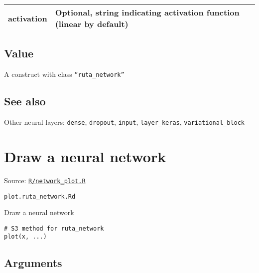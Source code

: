 \begin{longtable}[c]{@{}>{\small}p{3cm}>{\raggedright}p{12.5cm}@{}}
\toprule
activation & Optional, string indicating activation function (linear by
default)\tabularnewline
\bottomrule
\end{longtable}

\hypertarget{value}{\subsection{\texorpdfstring{\protect\hyperlink{value}{}Value}{Value}}\label{value}}

A construct with class \texttt{``ruta\_network''}

\hypertarget{see-also}{\subsection{\texorpdfstring{\protect\hyperlink{see-also}{}See
also}{See also}}\label{see-also}}

Other neural layers: \texttt{dense}, \texttt{dropout}, \texttt{input},
\texttt{layer\_keras}, \texttt{variational\_block}

\section{Draw a neural network}\label{draw-a-neural-network}

Source:
\href{https://github.com/fdavidcl/ruta/blob/master/R/network_plot.R}{\texttt{R/network\_plot.R}}

\texttt{plot.ruta\_network.Rd}

Draw a neural network

\begin{verbatim}
# S3 method for ruta_network
plot(x, ...)
\end{verbatim}

\hypertarget{arguments}{\subsection{\texorpdfstring{\protect\hyperlink{arguments}{}Arguments}{Arguments}}\label{arguments}}

